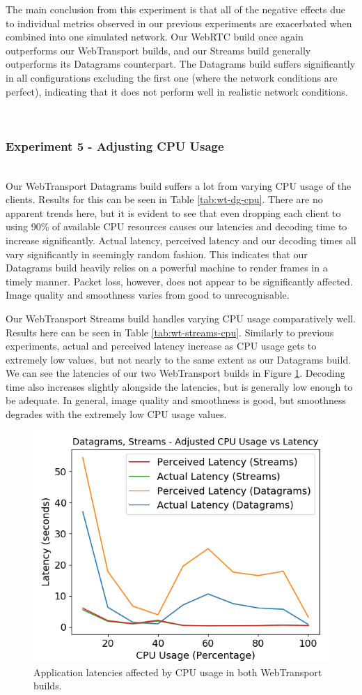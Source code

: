 The main conclusion from this experiment is that all of the negative effects due to individual metrics observed in our previous experiments are exacerbated when combined into one simulated network. Our WebRTC build once again outperforms our WebTransport builds, and our Streams build generally outperforms its Datagrams counterpart. The Datagrams build suffers significantly in all configurations excluding the first one (where the network conditions are perfect), indicating that it does not perform well in realistic network conditions.

\hfill{} \\
\subsubsection{Experiment 5 - Adjusting CPU Usage} 
\hfill{} \\
Our WebTransport Datagrams build suffers a lot from varying CPU usage of the clients. Results for this can be seen in Table \ref{tab:wt-dg-cpu}. There are no apparent trends here, but it is evident to see that even dropping each client to using 90\% of available CPU resources causes our latencies and decoding time to increase significantly. Actual latency, perceived latency and our decoding times all vary significantly in seemingly random fashion. This indicates that our Datagrams build heavily relies on a powerful machine to render frames in a timely manner. Packet loss, however, does not appear to be significantly affected. Image quality and smoothness varies from good to unrecognisable. 

Our WebTransport Streams build handles varying CPU usage comparatively well. Results here can be seen in Table \ref{tab:wt-streams-cpu}. Similarly to previous experiments, actual and perceived latency increase as CPU usage gets to extremely low values, but not nearly to the same extent as our Datagrams build. We can see the latencies of our two WebTransport builds in Figure \ref{fig:dg-streams-cpu-lat}. Decoding time also increases slightly alongside the latencies, but is generally low enough to be adequate. In general, image quality and smoothness is good, but smoothness degrades with the extremely low CPU usage values.

\begin{figure}[h]
    \centering
    \includegraphics[width=0.6\linewidth]{images/cpu/dg-streams-cpu-lat.png}
    \caption{Application latencies affected by CPU usage in both WebTransport builds.}
    \label{fig:dg-streams-cpu-lat} 
\end{figure}

